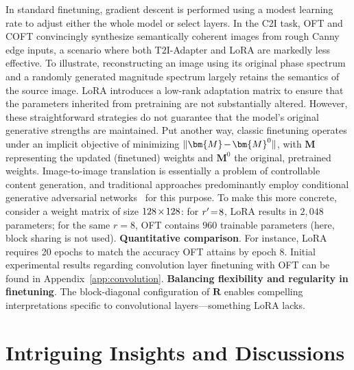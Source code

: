 In standard finetuning, gradient descent is performed using a modest learning rate to adjust either the whole model or select layers. In the C2I task, OFT and COFT convincingly synthesize semantically coherent images from rough Canny edge inputs, a scenario where both T2I-Adapter and LoRA are markedly less effective. To illustrate, reconstructing an image using its original phase spectrum and a randomly generated magnitude spectrum largely retains the semantics of the source image. LoRA introduces a low-rank adaptation matrix to ensure that the parameters inherited from pretraining are not substantially altered. However, these straightforward strategies do not guarantee that the model's original generative strengths are maintained. Put another way, classic finetuning operates under an implicit objective of minimizing $\thickmuskip=2mu \medmuskip=2mu \| \bm{M} - \bm{M}^0\|$, with $\bm{M}$ representing the updated (finetuned) weights and $\bm{M}^0$ the original, pretrained weights. Image-to-image translation is essentially a problem of controllable content generation, and traditional approaches predominantly employ conditional generative adversarial networks~\cite{isola2017image,zhu2017toward,wang2018high,park2019semantic,choi2018stargan} for this purpose. To make this more concrete, consider a weight matrix of size $\thickmuskip=2mu \medmuskip=2mu 128\times 128$: for $\thickmuskip=2mu \medmuskip=2mu r' = 8$, LoRA results in $2{,}048$ parameters; for the same $r = 8$, OFT contains $960$ trainable parameters (here, block sharing is not used). \textbf{Quantitative comparison}. For instance, LoRA requires 20 epochs to match the accuracy OFT attains by epoch 8. Initial experimental results regarding convolution layer finetuning with OFT can be found in Appendix~\ref{app:convolution}. \textbf{Balancing flexibility and regularity in finetuning}. The block-diagonal configuration of $\bm{R}$ enables compelling interpretations specific to convolutional layers—something LoRA lacks. \section{Intriguing Insights and Discussions}

